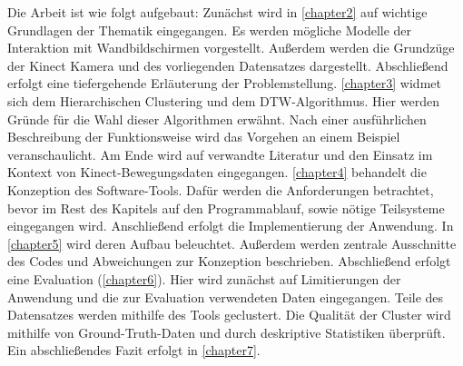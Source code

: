 Die Arbeit ist wie folgt aufgebaut:
Zunächst wird in \autoref{chapter2} auf wichtige Grundlagen der Thematik eingegangen.
Es werden mögliche Modelle der Interaktion mit Wandbildschirmen vorgestellt.
Außerdem werden die Grundzüge der Kinect Kamera und des vorliegenden Datensatzes dargestellt.
Abschließend erfolgt eine tiefergehende Erläuterung der Problemstellung.
\autoref{chapter3} widmet sich dem Hierarchischen Clustering und dem \ac{DTW}-Algorithmus.
Hier werden Gründe für die Wahl dieser Algorithmen erwähnt.
Nach einer ausführlichen Beschreibung der Funktionsweise
wird das Vorgehen an einem Beispiel veranschaulicht.
Am Ende wird auf verwandte Literatur
und den Einsatz im Kontext von Kinect-Bewegungsdaten eingegangen.
\autoref{chapter4} behandelt die Konzeption des Software-Tools.
Dafür werden die Anforderungen betrachtet,
bevor im Rest des Kapitels auf den Programmablauf,
sowie nötige Teilsysteme eingegangen wird.
Anschließend erfolgt die Implementierung der Anwendung.
In \autoref{chapter5} wird deren Aufbau beleuchtet.
Außerdem werden zentrale Ausschnitte des Codes
und Abweichungen zur Konzeption beschrieben.
Abschließend erfolgt eine Evaluation (\autoref{chapter6}).
Hier wird zunächst auf Limitierungen der Anwendung
und die zur Evaluation verwendeten Daten eingegangen.
Teile des Datensatzes werden mithilfe des Tools geclustert.
Die Qualität der Cluster wird mithilfe von Ground-Truth-Daten
und durch deskriptive Statistiken überprüft.
Ein abschließendes Fazit erfolgt in \autoref{chapter7}.